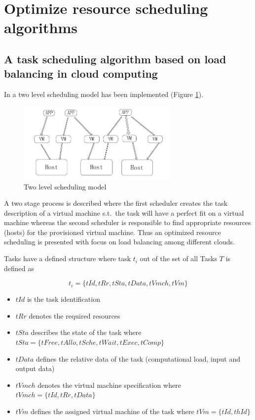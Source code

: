 \section{Optimize resource scheduling algorithms}

\subsection{A task scheduling algorithm based on load balancing in cloud computing}

In \cite{fang2010task} a two level scheduling model has been implemented (Figure \ref{fig:two_level_resource_scheduling}). 

\begin{figure}[htbp]
	\centering
		\includegraphics[width=0.7\textwidth]{figures/state_of_the_art/two_level_resource_scheduling.PNG}
	\caption{Two level scheduling model \cite{fang2010task}}
	\label{fig:two_level_resource_scheduling}
\end{figure}

A two stage process is described where the first scheduler creates the task description of a virtual machine s.t.~the task will have a perfect fit on a virtual machine whereas the second scheduler is responsible to find appropriate resources (hosts) for the provisioned virtual machine. Thus an optimized resource scheduling is presented with focus on load balancing among different clouds. 

Tasks have a defined structure where task $t_i$ out of the set of all Tasks $T$ is defined as 

\[t_i = \{tId, tRr, tSta, tData, tVmch, tVm\}\]

\begin{itemize}
	\item $tId$ is the task identification
	\item $tRr$ denotes the required resources
	\item $tSta$ describes the state of the task where $tSta = \{tFree,tAllo,tSche,tWait,tExec,tComp\}$
	\item $tData$ defines the relative data of the task (computational load, input and output data)
	\item $tVmch$ denotes the virtual machine specification where $tVmch = \{tId,tRr,tData\}$
	\item $tVm$ defines the assigned virtual machine of the task where $tVm = \{tId,thId\}$
\end{itemize}

